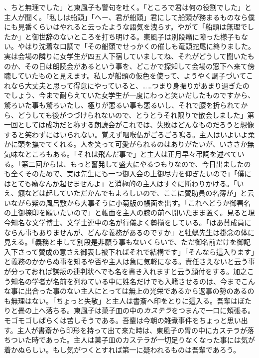 \documentclass[12pt, openright]{book}
\begin{document}
、ちと無理でした」と東風子も警句を吐く。「ところで君は何の役割でした」と主人が聞く。「私しは船頭」「へー、君が船頭」君にして船頭が務まるものなら僕にも見番くらいはやれると云ったような語気を洩らす。やがて「船頭は無理でしたか」と御世辞のないところを打ち明ける。東風子は別段癪に障った様子もない。やはり沈着な口調で「その船頭でせっかくの催しも竜頭蛇尾に終りました。実は会場の隣りに女学生が四五人下宿していましてね、それがどうして聞いたものか、その日は朗読会があるという事を、どこかで探知して会場の窓下へ来て傍聴していたものと見えます。私しが船頭の仮色を使って、ようやく調子づいてこれなら大丈夫と思って得意にやっていると、\ldots{}\ldots{}つまり身振りがあまり過ぎたのでしょう、今まで耐らえていた女学生が一度にわっと笑いだしたものですから、驚ろいた事も驚ろいたし、極りが悪るい事も悪るいし、それで腰を折られてから、どうしても後がつづけられないので、とうとうそれ限りで散会しました」第一回としては成功だと称する朗読会がこれでは、失敗はどんなものだろうと想像すると笑わずにはいられない。覚えず咽喉仏がごろごろ鳴る。主人はいよいよ柔かに頭を撫でてくれる。人を笑って可愛がられるのはありがたいが、いささか無気味なところもある。「それは飛んだ事で」と主人は正月早々弔詞を述べている。「第二回からは、もっと奮発して盛大にやるつもりなので、今日出ましたのも全くそのためで、実は先生にも一つ御入会の上御尽力を仰ぎたいので」「僕にはとても癪なんか起せませんよ」と消極的の主人はすぐに断わりかける。「いえ、癪などは起していただかんでもよろしいので、ここに賛助員の名簿が」と云いながら紫の風呂敷から大事そうに小菊版の帳面を出す。「これへどうか御署名の上御捺印を願いたいので」と帳面を主人の膝の前へ開いたまま置く。見ると現今知名な文学博士、文学士連中の名が行儀よく勢揃をしている。「はあ賛成員にならん事もありませんが、どんな義務があるのですか」と牡蠣先生は掛念の体に見える。「義務と申して別段是非願う事もないくらいで、ただ御名前だけを御記入下さって賛成の意さえ御表し被下ればそれで結構です」「そんなら這入ります」と義務のかからぬ事を知るや否や主人は急に気軽になる。責任さえないと云う事が分っておれば謀叛の連判状へでも名を書き入れますと云う顔付をする。加之こう知名の学者が名前を列ねている中に姓名だけでも入籍させるのは、今までこんな事に出合った事のない主人にとっては無上の光栄であるから返事の勢のあるのも無理はない。「ちょっと失敬」と主人は書斎へ印をとりに這入る。吾輩はぼたりと畳の上へ落ちる。東風子は菓子皿の中の\emph{カステラ}をつまんで一口に頬張る。モゴモゴしばらくは苦しそうである。吾輩は今朝の雑煮事件をちょっと思い出す。主人が書斎から印形を持って出て来た時は、東風子の胃の中にカステラが落ちついた時であった。主人は菓子皿のカステラが一切足りなくなった事には気が着かぬらしい。もし気がつくとすれば第一に疑われるものは吾輩であろう。
\end{document}
